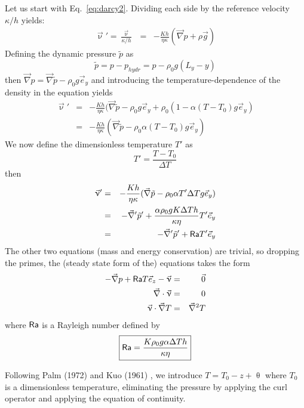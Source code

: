 Let us start with Eq.~\eqref{eq:darcy2}. Dividing each side by
the reference velocity $\kappa/h$ yields:
\begin{eqnarray}
\vec{\upnu}'=\frac{\vec{\upnu}}{\kappa/h}
&=&
-\frac{K h}{\eta \kappa} (\vec\nabla p + \rho \vec{g}) 
\end{eqnarray}
Defining the dynamic pressure $\tilde{p}$ as 
\[
\tilde{p} = p - p_{hydr} = p-\rho_0 g (L_y-y)
\]
then $\vec\nabla p = \vec \nabla \tilde{p} - \rho_0 g \vec{e}_y$ and introducing the temperature-dependence of the density in the equation yields
\begin{eqnarray}
\vec{\upnu}'
&=&
-\frac{K h}{\eta \kappa} (\vec\nabla \tilde{p} - \rho_0 g \vec{e}_y + \rho_0(1-\alpha(T-T_0) g  \vec{e}_y)  \\
&=&
-\frac{K h}{\eta \kappa} (\vec\nabla \tilde{p}  -\rho_0\alpha(T-T_0) g \vec{e}_y) 
\end{eqnarray}
We now define the dimensionless temperature $T'$ as
\[
T'= \frac{T-T_0}{\Delta T}
\]
then 
\begin{eqnarray}
\vec{\upnu}'
&=&
-\frac{K h}{\eta \kappa} (\vec\nabla \tilde{p}  -\rho_0\alpha T' \Delta T g \vec{e}_y)  \\
&=& - \vec\nabla' \tilde{p}' + \frac{\alpha \rho_0 g K \Delta T h}{\kappa \eta } T' \vec{e}_y  \\
&=& - \vec\nabla' \tilde{p}' + {\mathsf{Ra}} T' \vec{e}_y
\end{eqnarray}
The other two equations (mass and energy conservation) are trivial, so dropping the primes, 
the (steady state form of the) equations takes the form
\begin{eqnarray}
-\vec\nabla p + {\mathsf{Ra}} T \vec{e}_z - \vec{\upnu} &=& \vec{0} \\
\vec\nabla\cdot \vec\upnu &=& 0\\
\vec\upnu\cdot\vec\nabla T &=& \vec\nabla^2 T
\end{eqnarray}
where ${\mathsf{Ra}}$ is a Rayleigh number defined by
\[
\boxed{
{\mathsf{Ra}} = \frac{K \rho_0 g \alpha \Delta T h}{\kappa \eta}
}
\]

Following Palm \etal (1972) \cite{pawk72} and Kuo (1961) \cite{kuo61}, we introduce $T = T_0 - z + \uptheta$ where $T_0$ is a dimensionless temperature, eliminating the pressure by applying the curl operator and applying the equation of continuity.


